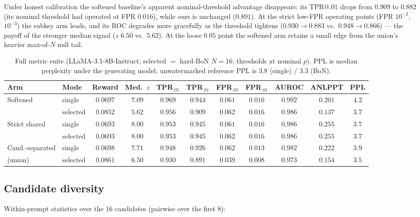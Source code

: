 \documentclass{article} %
\begin{document}
Under honest calibration the softened baseline's apparent nominal-threshold
advantage disappears: its TPR@$.01$ drops from $0.909$ to $0.882$ (its nominal
threshold had operated at FPR $0.016$), while ours is unchanged
($0.891$). At the strict low-FPR operating points
(FPR $10^{-2}$, $10^{-3}$) the subkey arm leads, and its ROC degrades more
gracefully as the threshold tightens ($0.930\!\to\!0.883$ vs.\
$0.948\!\to\!0.866$) --- the payoff of the stronger median signal
($z$ $6.50$ vs.\ $5.62$). At the loose $0.05$ point the softened arm retains a
small edge from the union's heavier max-of-$N$ null tail.

\begin{table}[h]
\caption{Full metric suite (LLaMA-3.1-8B-Instruct; selected $=$ hard-BoN
$N{=}16$; thresholds at nominal $p$). PPL is median perplexity under the
generating model; unwatermarked reference PPL is $3.8$ (single) / $3.3$ (BoN).}
\label{tab:suite}
\begin{center}
\small
\setlength{\tabcolsep}{4pt}
\begin{tabular}{llccccccccc}
\toprule
Arm & Mode & Reward & Med.\ $z$ & TPR$_{.05}$ & TPR$_{.01}$ & FPR$_{.05}$ & FPR$_{.01}$ & AUROC & ANLPPT & PPL \\
\midrule
Softened & single & $0.0697$ & $7.09$ & $0.969$ & $0.944$ & $0.061$ & $0.016$ & $0.992$ & $0.201$ & $4.2$ \\
         & selected & $0.0852$ & $5.62$ & $0.956$ & $0.909$ & $0.062$ & $0.016$ & $0.986$ & $0.137$ & $3.7$ \\
\midrule
Strict shared & single & $0.0693$ & $8.00$ & $0.953$ & $0.945$ & $0.061$ & $0.016$ & $0.986$ & $0.255$ & $3.7$ \\
              & selected & $0.0693$ & $8.00$ & $0.953$ & $0.945$ & $0.062$ & $0.016$ & $0.986$ & $0.255$ & $3.7$ \\
\midrule
Cand.-separated & single & $0.0698$ & $7.71$ & $0.948$ & $0.926$ & $0.062$ & $0.013$ & $0.982$ & $0.222$ & $3.9$ \\
(union) & selected & $0.0861$ & $6.50$ & $0.930$ & $0.891$ & $0.039$ & $0.008$ & $0.973$ & $0.154$ & $3.5$ \\
\bottomrule
\end{tabular}
\end{center}
\end{table}

\subsection{Candidate diversity}
Within-prompt statistics over the $16$ candidates (pairwise over the first $8$):
\end{document}
